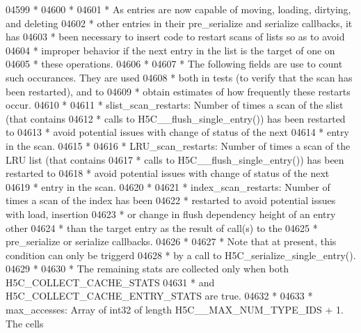 \begin{DoxyCode}
04599 \textcolor{comment}{ *}
04600 \textcolor{comment}{ * }
04601 \textcolor{comment}{ * As entries are now capable of moving, loading, dirtying, and deleting }
04602 \textcolor{comment}{ * other entries in their pre\_serialize and serialize callbacks, it has }
04603 \textcolor{comment}{ * been necessary to insert code to restart scans of lists so as to avoid }
04604 \textcolor{comment}{ * improper behavior if the next entry in the list is the target of one on }
04605 \textcolor{comment}{ * these operations.}
04606 \textcolor{comment}{ *}
04607 \textcolor{comment}{ * The following fields are use to count such occurances.  They are used }
04608 \textcolor{comment}{ * both in tests (to verify that the scan has been restarted), and to }
04609 \textcolor{comment}{ * obtain estimates of how frequently these restarts occur.}
04610 \textcolor{comment}{ *}
04611 \textcolor{comment}{ * slist\_scan\_restarts: Number of times a scan of the slist (that contains}
04612 \textcolor{comment}{ *      calls to H5C\_\_flush\_single\_entry()) has been restarted to }
04613 \textcolor{comment}{ *      avoid potential issues with change of status of the next }
04614 \textcolor{comment}{ *      entry in the scan.}
04615 \textcolor{comment}{ *}
04616 \textcolor{comment}{ * LRU\_scan\_restarts: Number of times a scan of the LRU list (that contains}
04617 \textcolor{comment}{ *              calls to H5C\_\_flush\_single\_entry()) has been restarted to }
04618 \textcolor{comment}{ *              avoid potential issues with change of status of the next }
04619 \textcolor{comment}{ *              entry in the scan.}
04620 \textcolor{comment}{ *}
04621 \textcolor{comment}{ * index\_scan\_restarts: Number of times a scan of the index has been }
04622 \textcolor{comment}{ *      restarted to avoid potential issues with load, insertion}
04623 \textcolor{comment}{ *      or change in flush dependency height of an entry other }
04624 \textcolor{comment}{ *      than the target entry as the result of call(s) to the}
04625 \textcolor{comment}{ *      pre\_serialize or serialize callbacks.}
04626 \textcolor{comment}{ *}
04627 \textcolor{comment}{ *      Note that at present, this condition can only be triggerd}
04628 \textcolor{comment}{ *      by a call to H5C\_serialize\_single\_entry().}
04629 \textcolor{comment}{ *}
04630 \textcolor{comment}{ * The remaining stats are collected only when both H5C\_COLLECT\_CACHE\_STATS}
04631 \textcolor{comment}{ * and H5C\_COLLECT\_CACHE\_ENTRY\_STATS are true.}
04632 \textcolor{comment}{ *}
04633 \textcolor{comment}{ * max\_accesses: Array of int32 of length H5C\_\_MAX\_NUM\_TYPE\_IDS + 1.  The cells}

\end{DoxyCode}
